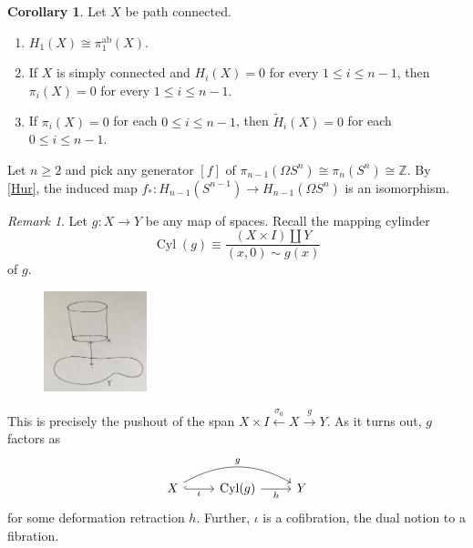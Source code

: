 \documentclass[10pt,letterpaper,cm]{nupset}
\theoremstyle{definition}
\theoremstyle{theorem}
\newtheorem{corollary}[defn]{Corollary}
\theoremstyle{remark}
\newtheorem{remark}[defn]{Remark}
\newcommand{\Z}{\mathbb Z}
\newcommand{\1}{\mathbb{1}}
\newcommand{\0}{\vec 0}
\DeclareMathOperator{\ab}{ab}
\DeclareMathOperator{\cyl}{Cyl}
\newcommand{\be}{\begin{enumerate}}
\newcommand{\ee}{\end{enumerate}}
\begin{document}
\begin{corollary}\label{Hcor} Let $X$ be path connected.
\be
\item $H_1(X) \cong  \pi_1^{\ab}(X)$.
\item If $X$ is simply connected and $H_i(X) =0$ for every $1\leq i \leq n-1$, then $\pi_i(X) =0$ for every $1\leq i\leq n-1$.
\item If $\pi_i(X) =0$ for each $0\leq i \leq n-1$, then $\widetilde{H}_i(X) =0$ for each $0 \leq i \leq n-1$. 
\ee
\end{corollary}

\smallskip

Let $n\geq 2$ and pick any generator $\left[f\right]$ of $\pi_{n-1}(\Omega{S^n}) \cong \pi_n(S^n) \cong \Z$. By \cref{Hur}, the induced map $f_{\ast} : H_{n-1}(S^{n-1}) \to H_{n-1}(\Omega{S^n})$ is an isomorphism.

\begin{remark}
Let $g: X \to Y$ be any map of spaces. Recall the mapping cylinder 
\[
\cyl(g) \equiv \frac{\left(X \times I\right) \coprod Y}{\left(x,0\right)\sim g(x)}
\]
of $g$. 

\begin{figure}[H]
\centering
\includegraphics[width=30mm]{map-cyl.jpg}
\end{figure}

This is precisely the pushout of the span $X \times I \overset{\sigma_0}{\longleftarrow} X \overset{g}{\longrightarrow} Y$. As it turns out, $g$ factors as
\[
\begin{tikzcd}
X \arrow[rr, "g", bend left] \arrow[r, "\iota"', hook] & \cyl(g) \arrow[r, "h"'] & Y
\end{tikzcd}
\] for some deformation retraction $h$. Further, $\iota$ is a cofibration, the dual notion to a fibration.
\end{remark}

\smallskip
\end{document}
